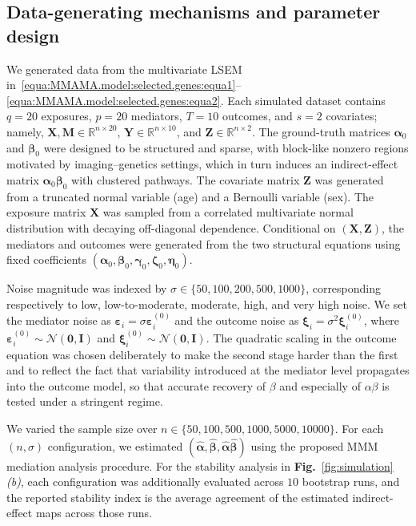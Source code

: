 \documentclass[
  12pt]{article}
\begin{document}
\subsection{Data-generating mechanisms and parameter design}

We generated data from the multivariate LSEM in~\eqref{equa:MMAMA.model:selected.genes:equa1}--\eqref{equa:MMAMA.model:selected.genes:equa2}.
Each simulated dataset contains $q=20$ exposures, $p=20$ mediators, $T=10$ outcomes, and $s=2$ covariates; namely, $\mathbf X,\mathbf M\in\mathbb{R}^{n\times 20}$, $\mathbf Y\in\mathbb{R}^{n\times 10}$, and $\mathbf Z\in\mathbb{R}^{n\times 2}$.
The ground-truth matrices $\bm{\alpha}_0$ and $\bm{\beta}_0$ were designed to be structured and sparse, with block-like nonzero regions motivated by imaging--genetics settings, which in turn induces an indirect-effect matrix $\bm{\alpha}_0\bm{\beta}_0$ with clustered pathways.
The covariate matrix $\mathbf Z$ was generated from a truncated normal variable (age) and a Bernoulli variable (sex).
The exposure matrix $\mathbf X$ was sampled from a correlated multivariate normal distribution with decaying off-diagonal dependence.
Conditional on $(\mathbf X,\mathbf Z)$, the mediators and outcomes were generated from the two structural equations using fixed coefficients $(\bm{\alpha}_0,\bm{\beta}_0,\bm{\gamma}_0,\bm{\zeta}_0,\bm{\eta}_0)$.

Noise magnitude was indexed by $\sigma\in\{50,100,200,500,1000\}$, corresponding respectively to low, low-to-moderate, moderate, high, and very high noise.
We set the mediator noise as $\bm{\varepsilon}_i=\sigma \bm{\varepsilon}_i^{(0)}$ and the outcome noise as $\bm{\xi}_i=\sigma^2\bm{\xi}_i^{(0)}$, where $\bm{\varepsilon}_i^{(0)}\sim\mathcal{N}(\bm{0},\mathbf{I})$ and $\bm{\xi}_i^{(0)}\sim\mathcal{N}(\bm{0},\mathbf{I})$.
The quadratic scaling in the outcome equation was chosen deliberately to make the second stage harder than the first and to reflect the fact that variability introduced at the mediator level propagates into the outcome model, so that accurate recovery of $\beta$ and especially of $\alpha\beta$ is tested under a stringent regime.

We varied the sample size over
$n\in\{50,100,500,1000,5000,10000\}$.
For each $(n,\sigma)$ configuration, we estimated $(\widehat{\bm{\alpha}},\widehat{\bm{\beta}},\widehat{\bm{\alpha}}\widehat{\bm{\beta}})$ using the proposed MMM mediation analysis procedure.
For the stability analysis in \textbf{Fig.}~\ref{fig:simulation}\textit{(b)}, each configuration was additionally evaluated across $10$ bootstrap runs, and the reported stability index is the average agreement of the estimated indirect-effect maps across those runs.
\end{document}

